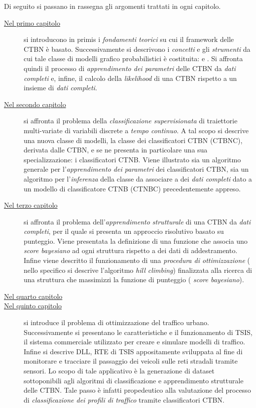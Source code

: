 
Di seguito si passano in rassegna gli argomenti trattati in ogni capitolo.
\begin{description}
	\item[{\hyperref[cap:ctbn]{Nel primo capitolo}}]
	si introducono in primis i \emph{fondamenti teorici} su cui il framework delle \acf{CTBN} è basato. Successivamente si descrivono i \emph{concetti} e gli \emph{strumenti} da cui tale classe di modelli grafico probabilistici è costituita: \emph{\cim{}} e \emph{\stats{}}. Si affronta quindi il processo di \emph{apprendimento dei parametri} delle \acs{CTBN} da \emph{dati completi} e, infine, il calcolo della \emph{likelihood} di una \acs{CTBN} rispetto a un insieme di \emph{dati completi}.
	\item[{\hyperref[cap:ctbnc]{Nel secondo capitolo}}]
	si affronta il problema della \emph{classificazione supervisionata} di traiettorie multi-variate di variabili discrete a \emph{tempo continuo}. A tal scopo si descrive una nuova classe di modelli, la classe dei classificatori \acl{CTBN} (\acs{CTBNC}), derivata dalle \acs{CTBN}, e se ne presenta in particolare una sua specializzazione: i classificatori \acs{CTNB}. Viene illustrato sia un algoritmo generale per l'\emph{apprendimento dei parametri} dei classificatori \acs{CTBN}, sia un algoritmo per l'\emph{inferenza} della classe da associare a dei \emph{dati completi} dato a un modello di classificatore \acs{CTNB} (\acs{CTNBC}) precedentemente appreso.
	\item[{\hyperref[cap:structurallearning]{Nel terzo capitolo}}]
	si affronta il problema dell'\emph{apprendimento strutturale} di una \acs{CTBN} da \emph{dati completi}, per il quale si presenta un approccio risolutivo basato su punteggio. Viene presentata la definizione di una funzione che associa uno \emph{score bayesiano} ad ogni struttura rispetto a dei dati di addestramento. Infine viene descritto il funzionamento di una \emph{procedura di ottimizzazione} (\ie{} nello specifico si descrive l'algoritmo \emph{hill climbing}) finalizzata alla ricerca di una struttura che massimizzi la funzione di punteggio (\ie{} \emph{score bayesiano}).
	\item[{\hyperref[cap:ctbnr]{Nel quarto capitolo}}]
	\omissis{}
	\item[{\hyperref[cap:tsis-sensors]{Nel quinto capitolo}}]
	si introduce il problema di ottimizzazione del traffico urbano. Successivamente si presentano le caratteristiche e il funzionamento di \acf{TSIS}, il sistema commerciale utilizzato per creare e simulare modelli di traffico. Infine si descrive  \acs{DLL}, \acl{RTE} di \acs{TSIS} appositamente sviluppata al fine di monitorare e tracciare il passaggio dei veicoli sulle reti stradali tramite sensori. Lo scopo di tale applicativo è la generazione di dataset sottoponibili agli algoritmi di classificazione e apprendimento strutturale delle \acs{CTBN}. Tale passo è infatti propedeutico alla valutazione del processo di \emph{classificazione dei profili di traffico} tramite classificatori \acs{CTBN}.

\end{description}
